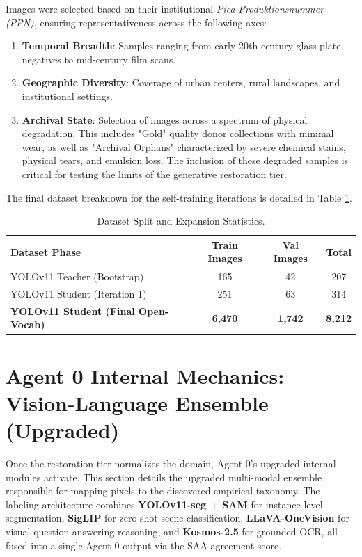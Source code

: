 \documentclass[12pt,onecolumn,a4paper]{IEEEtran}
\begin{document}
Images were selected based on their institutional \textit{Pica-Produktionsnummer (PPN)}, ensuring representativeness across the following axes:
\begin{enumerate}[label=\textbf{\Alph*.}]
    \item \textbf{Temporal Breadth}: Samples ranging from early 20th-century glass plate negatives to mid-century film scans.
    \item \textbf{Geographic Diversity}: Coverage of urban centers, rural landscapes, and institutional settings.
    \item \textbf{Archival State}: Selection of images across a spectrum of physical degradation. This includes "Gold" quality donor collections with minimal wear, as well as "Archival Orphans" characterized by severe chemical stains, physical tears, and emulsion loss. The inclusion of these degraded samples is critical for testing the limits of the generative restoration tier.
\end{enumerate}

The final dataset breakdown for the self-training iterations is detailed in Table \ref{tab:dataset_stats}.

\begin{table}[!htbp]
\centering
\caption{Dataset Split and Expansion Statistics.}
\label{tab:dataset_stats}
\begin{tabular}{lccc}
\toprule
Dataset Phase & Train Images & Val Images & Total \\
\midrule
YOLOv11 Teacher (Bootstrap) & 165 & 42 & 207 \\
YOLOv11 Student (Iteration 1) & 251 & 63 & 314 \\
\textbf{YOLOv11 Student (Final Open-Vocab)} & \textbf{6,470} & \textbf{1,742} & \textbf{8,212} \\
\bottomrule
\end{tabular}
\end{table}

\section{Agent 0 Internal Mechanics: Vision-Language Ensemble (Upgraded)}
Once the restoration tier normalizes the domain, Agent 0's upgraded internal modules activate. This section details the upgraded multi-modal ensemble responsible for mapping pixels to the discovered empirical taxonomy.
The labeling architecture combines \textbf{YOLOv11-seg + SAM} for instance-level segmentation, \textbf{SigLIP} for zero-shot scene classification, \textbf{LLaVA-OneVision} for visual question-answering reasoning, and \textbf{Kosmos-2.5} for grounded OCR, all fused into a single Agent 0 output via the SAA agreement score.
\end{document}
